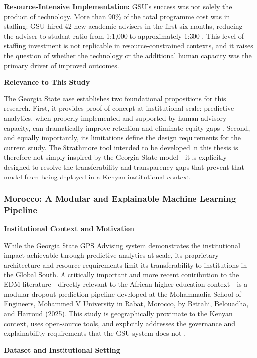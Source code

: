 \documentclass[12pt]{report}
\begin{document}
\textbf{Resource-Intensive Implementation:} GSU's success was not
solely the product of technology. More than 90\% of the total programme
cost was in staffing: GSU hired 42 new academic advisers in the first
six months, reducing the adviser-to-student ratio from 1:1,000 to
approximately 1:300 \parencite{NPR2016}. This level of staffing
investment is not replicable in resource-constrained contexts, and
it raises the question of whether the technology or the additional
human capacity was the primary driver of improved outcomes.

\textbf{Relevance to This Study}

The Georgia State case establishes two foundational propositions for
this research. First, it provides proof of concept at institutional
scale: predictive analytics, when properly implemented and supported
by human advisory capacity, can dramatically improve retention and
eliminate equity gaps \parencite{GSU2024}. Second, and equally
importantly, its limitations define the design requirements for the
current study. The Strathmore tool intended to be developed in this thesis is therefore not
simply inspired by the Georgia State model---it is explicitly designed
to resolve the transferability and transparency gaps that prevent that
model from being deployed in a Kenyan institutional context.

\subsubsection{Morocco: A Modular and Explainable Machine Learning Pipeline}

\textbf{Institutional Context and Motivation}

While the Georgia State GPS Advising system demonstrates the institutional
impact achievable through predictive analytics at scale, its proprietary
architecture and resource requirements limit its transferability to
institutions in the Global South. A critically important and more recent
contribution to the EDM literature---directly relevant to the African
higher education context---is a modular dropout prediction pipeline
developed at the Mohammadia School of Engineers, Mohammed V University
in Rabat, Morocco, by Bettahi, Belouadha, and Harroud (2025). This study
is geographically proximate to the Kenyan context, uses open-source tools,
and explicitly addresses the governance and explainability requirements
that the GSU system does not \parencite{bettahi2025}.

\textbf{Dataset and Institutional Setting}
\end{document}

